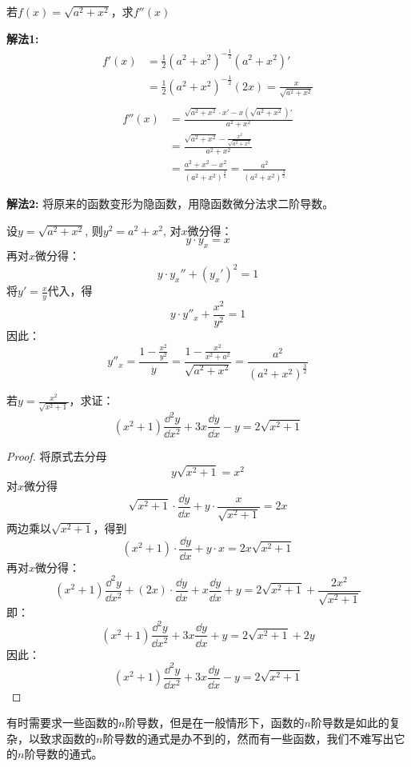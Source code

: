 \begin{example}
若$f(x)=\sqrt{a^2+x^2}$，求$f''(x)$
\end{example}


\begin{solution}
\textbf{解法1: }
\[\begin{split}
    f'(x)&=\frac{1}{2}(a^2+x^2)^{-\tfrac{1}{2}}(a^2+x^2)'\\
    &=\frac{1}{2}(a^2+x^2)^{-\tfrac{1}{2}}(2x)=\frac{x}{\sqrt{a^2+x^2}}\\
\end{split}\]
\[\begin{split}
f''(x)&=\frac{\sqrt{a^2+x^2}\cdot x'-x\left(\sqrt{a^2+x^2}\right)'}{a^2+x^2}\\
&=\frac{\sqrt{a^2+x^2}-\frac{x^2}{\sqrt{a^2+x^2}}}{{a^2+x^2}}\\
&=\frac{a^2+x^2-x^2}{(a^2+x^2)^{\tfrac{3}{2}}}=\frac{a^2}{(a^2+x^2)^{\tfrac{3}{2}}}
\end{split}\]

\textbf{解法2: } 将原来的函数变形为隐函数，用隐函数微分法求二阶导数。

设$y=\sqrt{a^2+x^2}$, 则$y^2=a^2+x^2$, 对$x$微分得：
\[y\cdot y_x=x\]    
再对$x$微分得：
\[y\cdot y_x''+(y_x')^2=1\]
将$y'=\frac{x}{y}$代入，得
\[y\cdot y''_x+\frac{x^2}{y^2}=1\]
因此：
\[y''_x=\frac{1-\frac{x^2}{y^2}}{y}=\frac{1-\frac{x^2}{x^2+a^2}}{\sqrt{a^2+x^2}}=\frac{a^2}{(a^2+x^2)^{\tfrac{3}{2}}}\]
\end{solution}

\begin{example}
    若$y=\frac{x^2}{\sqrt{x^2+1}}$，求证：
\[(x^2+1)\frac{\dd^2 y}{\dd x^2}+3x\frac{\dd y}{\dd x}-y=2\sqrt{x^2+1}\]
\end{example}

\begin{proof}
将原式去分母
\[y\sqrt{x^2+1}=x^2\]
对$x$微分得
\[\sqrt{x^2+1}\cdot\frac{\dd y}{\dd x}+y\cdot \frac{x}{\sqrt{x^2+1}}=2x\]
两边乘以$\sqrt{x^2+1}$，得到
\[(x^2+1)\cdot \frac{\dd y}{\dd x}+y\cdot x=2x\sqrt{x^2+1}\]
再对$x$微分得：
\[(x^2+1)\frac{\dd^2 y}{\dd x^2}+(2x)\cdot \frac{\dd y}{\dd x}+x\frac{\dd y}{\dd x}+y=2\sqrt{x^2+1}+\frac{2x^2}{\sqrt{x^2+1}}\]
即：
\[(x^2+1)\frac{\dd^2 y}{\dd x^2}+3x\frac{\dd y}{\dd x}+y=2\sqrt{x^2+1}+2y\]
因此：
\[(x^2+1)\frac{\dd^2 y}{\dd x^2}+3x\frac{\dd y}{\dd x}-y=2\sqrt{x^2+1}\]
\end{proof}

有时需要求一些函数的$n$阶导数，但是在一般情形下，函数的$n$阶导数是如此的复杂，以致求函数的$n$阶导数的通式是办不到的，然而有一些函数，我们不难写出它的$n$阶导数的通式。

